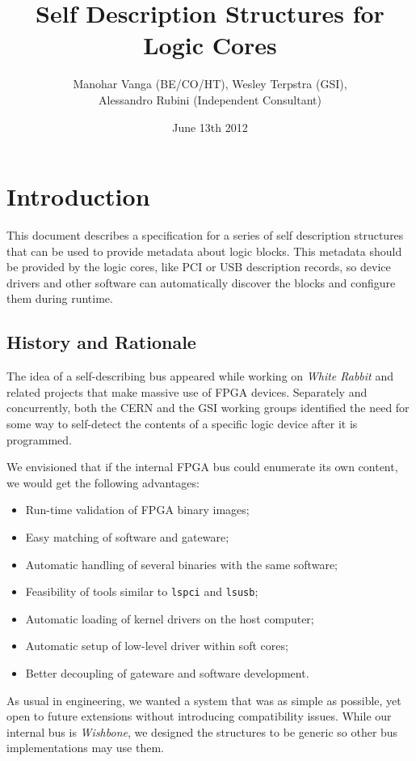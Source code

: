 \documentclass[a4paper, 12pt]{article}
\title{Self Description Structures for Logic Cores}
\author{Manohar Vanga (BE/CO/HT), Wesley Terpstra (GSI),\\
Alessandro Rubini (Independent Consultant)}
\date{June 13th 2012}
\begin{document}
\maketitle

\tableofcontents
\listoftables
\listoffigures

\pagebreak

\section{Introduction}

This document describes a specification for a series of self description
structures that can be used to provide metadata about logic blocks. This metadata
should be provided by the logic cores, like PCI or USB description records,
so device drivers and other software can automatically discover the blocks and
configure them during runtime.

\subsection{History and Rationale}

The idea of a self-describing bus appeared while working on
\textit{White Rabbit} and related projects that make massive use of
FPGA devices. Separately and concurrently, both the CERN and the GSI
working groups identified the need for some way to self-detect the
contents of a specific logic device after it is programmed.

We envisioned that if the internal FPGA bus could enumerate its own
content, we would get the following advantages:

\begin{itemize}
\item Run-time validation of FPGA binary images;
\item Easy matching of software and gateware;
\item Automatic handling of several binaries with the same software;
\item Feasibility of tools similar to \texttt{lspci} and \texttt{lsusb};
\item Automatic loading of kernel drivers on the host computer;
\item Automatic setup of low-level driver within soft cores;
\item Better decoupling of gateware and software development.
\end{itemize}

As usual in engineering, we wanted a system that was as simple as possible,
yet open to future extensions without introducing compatibility issues.
While our internal bus is \textit{Wishbone}, we designed the structures
to be generic so other bus implementations may use them. 
\end{document}
